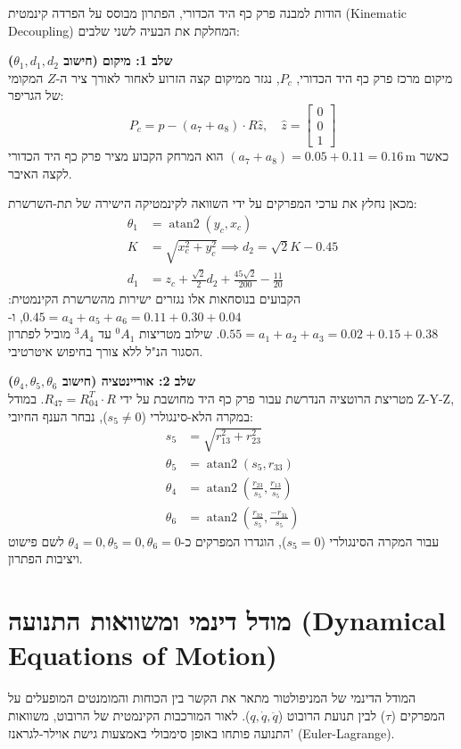 \documentclass[11pt,a4paper]{article}
\begin{document}
הודות למבנה פרק כף היד הכדורי, הפתרון מבוסס על הפרדה קינמטית (\textenglish{Kinematic Decoupling}) המחלקת את הבעיה לשני שלבים:

\textbf{שלב 1: מיקום (חישוב $\theta_1, d_1, d_2$)} \\
מיקום מרכז פרק כף היד הכדורי, $P_c$, נגזר ממיקום קצה הזרוע לאחור לאורך ציר ה-$Z$ המקומי של הגריפר:
\begin{equation}
P_c = p - (a_7+a_8) \cdot R \hat{z}, \quad \hat{z}=\begin{bmatrix}0\\0\\1\end{bmatrix}
\end{equation}
כאשר $(a_7+a_8) = 0.05+0.11 = 0.16\,\text{m}$ הוא המרחק הקבוע מציר פרק כף היד הכדורי לקצה האיבר.

מכאן נחלץ את ערכי המפרקים על ידי השוואה לקינמטיקה הישירה של תת-השרשרת:
\begin{align}
\theta_1 &= \operatorname{atan2}(y_c, x_c) \nonumber \\
K &= \sqrt{x_c^2 + y_c^2} \implies d_2 = \sqrt{2}K - 0.45 \nonumber \\
d_1 &= z_c + \frac{\sqrt{2}}{2}d_2 + \frac{45\sqrt{2}}{200} - \frac{11}{20}
\end{align}
הקבועים בנוסחאות אלו נגזרים ישירות מהשרשרת הקינמטית: $0.45 = a_4+a_5+a_6 = 0.11+0.30+0.04$, ו-$0.55 = a_1+a_2+a_3 = 0.02+0.15+0.38$. שילוב מטריצות $^0A_1$ עד $^3A_4$ מוביל לפתרון הסגור הנ"ל ללא צורך בחיפוש איטרטיבי.

\textbf{שלב 2: אוריינטציה (חישוב $\theta_4, \theta_5, \theta_6$)} \\
מטריצת הרוטציה הנדרשת עבור פרק כף היד מחושבת על ידי $R_{47} = R_{04}^T \cdot R$. במודל \textenglish{Z-Y-Z}, במקרה הלא-סינגולרי ($s_5 \neq 0$), נבחר הענף החיובי:
\begin{align}
s_5 &= \sqrt{r_{13}^2 + r_{23}^2} \nonumber \\
\theta_5 &= \operatorname{atan2}(s_5, r_{33}) \nonumber \\
\theta_4 &= \operatorname{atan2}\left(\frac{r_{23}}{s_5}, \frac{r_{13}}{s_5}\right) \nonumber \\
\theta_6 &= \operatorname{atan2}\left(\frac{r_{32}}{s_5}, \frac{-r_{31}}{s_5}\right)
\end{align}
עבור המקרה הסינגולרי ($s_5 = 0$), הוגדרו המפרקים כ-$\theta_4=0, \theta_5=0, \theta_6=0$ לשם פישוט ויציבות הפתרון.


\section{מודל דינמי ומשוואות התנועה (\textenglish{Dynamical Equations of Motion})}
המודל הדינמי של המניפולטור מתאר את הקשר בין הכוחות והמומנטים המופעלים על המפרקים ($\tau$) לבין תנועת הרובוט ($q, \dot{q}, \ddot{q}$). לאור המורכבות הקינמטית של הרובוט, משוואות התנועה פותחו באופן סימבולי באמצעות גישת אוילר-לגראנז' (\textenglish{Euler-Lagrange}).
\end{document}
